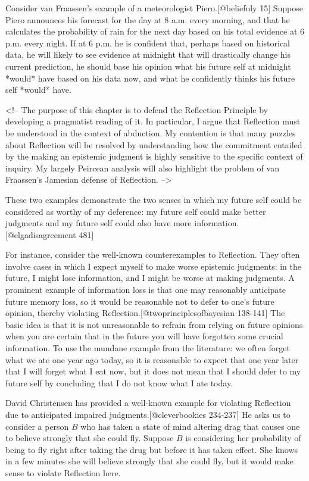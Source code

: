 Consider van Fraassen's example of a meteorologist Piero.{[}@beliefuly
15{]} Suppose Piero announces his forecast for the day at 8 a.m. every
morning, and that he calculates the probability of rain for the next day
based on his total evidence at 6 p.m. every night. If at 6 p.m. he is
confident that, perhaps based on historical data, he will likely to see
evidence at midnight that will drastically change his current
prediction, he should base his opinion what his future self at midnight
*would* have based on his data now, and what he confidently thinks his
future self *would* have.

\textless{}!-- The purpose of this chapter is to defend the Reflection
Principle by developing a pragmatist reading of it. In particular, I
argue that Reflection must be understood in the context of abduction. My
contention is that many puzzles about Reflection will be resolved by
understanding how the commitment entailed by the making an epistemic
judgment is highly sensitive to the specific context of inquiry. My
largely Peircean analysis will also highlight the problem of van
Fraassen's Jamesian defense of Reflection. --\textgreater{}

These two examples demonstrate the two senses in which my future self
could be considered as worthy of my deference: my future self could make
better judgments and my future self could also have more
information.{[}@elgadisagreement 481{]}

For instance, consider the well-known counterexamples to Reflection.
They often involve cases in which I expect myself to make worse
epistemic judgments: in the future, I might lose information, and I
might be worse at making judgments. A prominent example of information
loss is that one may reasonably anticipate future memory loss, so it
would be reasonable not to defer to one's future opinion, thereby
violating Reflection.{[}@twoprinciplesofbayesian 138-141{]} The basic
idea is that it is not unreasonable to refrain from relying on future
opinions when you are certain that in the future you will have forgotten
some crucial information. To use the mundane example from the
literature: we often forget what we ate one year ago today, so it is
reasonable to expect that one year later that I will forget what I eat
now, but it does not mean that I should defer to my future self by
concluding that I do not know what I ate today.

David Christensen has provided a well-known example for violating
Reflection due to anticipated impaired judgments.{[}@cleverbookies
234-237{]} He asks us to consider a person \(B\) who has taken a state
of mind altering drag that causes one to believe strongly that she could
fly. Suppose \(B\) is considering her probability of being to fly right
after taking the drug but before it has taken effect. She knows in a few
minutes she will believe strongly that she could fly, but it would make
sense to violate Reflection here.


